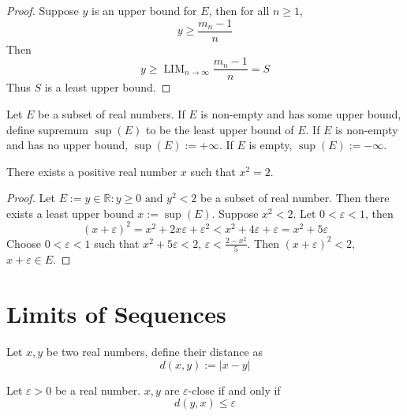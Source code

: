 \documentclass{blog}
\DeclareMathOperator{\LIM}{LIM}
\begin{document}
\begin{proof}
  Suppose $y$ is an upper bound for $E$, then for all $n \geq 1$,
  \begin{equation*}
    y \geq \frac{m_{n} - 1}{n}
  \end{equation*}
  Then
  \begin{equation*}
    y \geq \LIM_{n \to \infty} \frac{m_{n} - 1}{n} = S
  \end{equation*}
  Thus $S$ is a least upper bound.
\end{proof}

\begin{definition}[supremum]
  Let $E$ be a subset of real numbers.
  If $E$ is non-empty and has some upper bound,
  define supremum $\sup(E)$ to be the least upper bound of $E$.
  If $E$ is non-empty and has no upper bound, $\sup(E) := +\infty$.
  If $E$ is empty, $\sup(E) := -\infty$.
\end{definition}

\begin{proposition}
  There exists a positive real number $x$ such that $x^{2} = 2$.
\end{proposition}

\begin{proof}
  Let $E := {y \in \mathbb{R} : y \geq 0 \text{ and } y^{2} < 2}$ be a subset of real number.
  Then there exists a least upper bound $x := \sup(E)$.
  Suppose $x^{2} < 2$.
  Let $0 < \varepsilon < 1$, then
  \begin{equation*}
    (x + \varepsilon)^{2} = x^{2} + 2 x \varepsilon + \varepsilon^{2}
    < x^{2} + 4 \varepsilon + \varepsilon = x^{2} + 5 \varepsilon
  \end{equation*}
  Choose $0 < \varepsilon < 1$ such that $x^{2} + 5 \varepsilon < 2$,
  $\varepsilon < \frac{2 - x^{2}}{5}$.
  Then $(x + \varepsilon)^{2} < 2$, $x + \varepsilon \in E$.
\end{proof}

\section{Limits of Sequences}
\begin{definition}[distance]
  Let $x, y$ be two real numbers, define their distance as
  \begin{equation}
    \label{EQ:DISTANCE_BETWEEN_REAL_NUMBERS}
    d(x, y) := |x - y|
  \end{equation}
\end{definition}

\begin{definition}
  Let $\varepsilon > 0$ be a real number.
  $x, y$ are $\varepsilon$-close if and only if
  \begin{equation}
    d(y, x) \leq \varepsilon
  \end{equation}
\end{definition}
\end{document}
